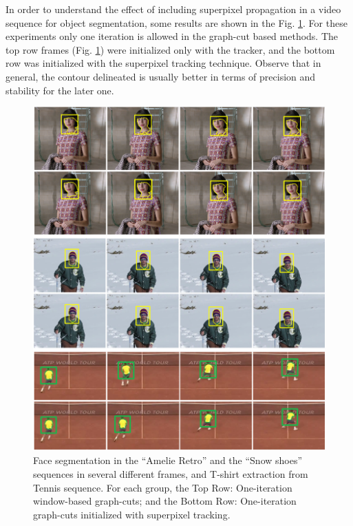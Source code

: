 In order to understand the effect of including superpixel propagation in a video sequence for object
segmentation, some results are shown in the Fig. \ref{figurelabel_comp}. For these experiments only one iteration is
allowed in the graph-cut based methods. The top row frames (Fig. \ref{figurelabel_comp}) were initialized only with the tracker, 
and the bottom row was initialized with the superpixel tracking technique. 
Observe that in general, the contour delineated is usually better in terms of precision and
stability for the later one.
   \begin{figure}[thp]
      \centering
      \includegraphics[width=1.0\textwidth]{../images/compareSegm.png}
      \caption{Face segmentation in the “Amelie Retro” and the
	      “Snow shoes” sequences in several different frames, and T-shirt extraction from Tennis sequence. For each
	       group, the Top Row: One-iteration window-based graph-cuts;
	       and the Bottom Row: One-iteration graph-cuts initialized with superpixel tracking.}
      \label{figurelabel_comp}
   \end{figure}
